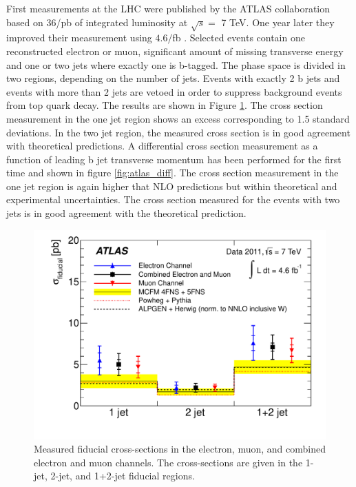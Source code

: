 	First measurements at the LHC were published by the ATLAS collaboration based on 36/pb of integrated luminosity at $\sqrt{s} =$ 7 TeV. One year later they improved their measurement using $4.6/$fb \cite{Aad:2013vka}. Selected events contain one reconstructed electron or muon, significant amount of missing transverse energy and one or two jets where exactly one is b-tagged. The phase space is divided in two regions, depending on the number of jets. Events with exactly 2 b jets and events with more than 2 jets are vetoed in order to suppress background events from top quark decay. The results are shown in Figure \ref{fig:atlas_tot}. The cross section measurement in the one jet region shows an excess corresponding to 1.5 standard deviations. In the two jet region, the measured cross section is in good agreement with theoretical predictions. A differential cross section measurement as a function of leading b jet transverse momentum has been performed for the first time and shown in figure \ref{fig:atlas_diff}. The cross section measurement in the one jet region is again higher that NLO predictions but within theoretical and experimental uncertainties. The cross section measured for the events with two jets is in good agreement with the theoretical prediction.
\begin{figure}[htbp]
	\centering
		\includegraphics[width=0.7\linewidth]{Figures/atlas_total.pdf}
	\caption[Atlas Wbb total cross section measurement]{Measured fiducial cross-sections in the electron, muon, and combined electron and muon channels. The cross-sections are given in the 1-jet, 2-jet, and 1+2-jet fiducial regions.\cite{Aad:2013vka} }
	\label{fig:atlas_tot}
\end{figure}


